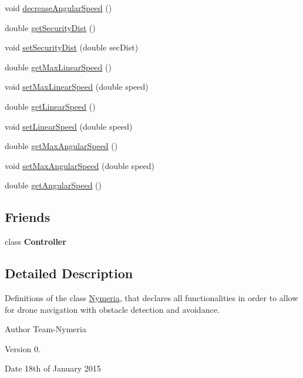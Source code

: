 \begin{DoxyCompactItemize}
void \hyperlink{classNymeria_a354a426d9626623eb60f59bea93cf888}{decrease\-Angular\-Speed} ()
\item 
double \hyperlink{classNymeria_a39846f73d57a98ab24a80a80be38ddef}{get\-Security\-Dist} ()
\item 
void \hyperlink{classNymeria_af145b44f01dc82ba70f3b09bc459364d}{set\-Security\-Dist} (double sec\-Dist)
\item 
double \hyperlink{classNymeria_adce898b1df4cdfe04a3dd6fca7745f36}{get\-Max\-Linear\-Speed} ()
\item 
void \hyperlink{classNymeria_a97fb26da752c0ac03b4f0874f9513e01}{set\-Max\-Linear\-Speed} (double speed)
\item 
double \hyperlink{classNymeria_a791c7e89a7044302557f7f1dbd6f6f84}{get\-Linear\-Speed} ()
\item 
void \hyperlink{classNymeria_a6217513fd20574947ec6ca0405668c1a}{set\-Linear\-Speed} (double speed)
\item 
double \hyperlink{classNymeria_abee78301bcaf62d61f2777aa2c5b9449}{get\-Max\-Angular\-Speed} ()
\item 
void \hyperlink{classNymeria_a8f4694ca2039c6893706566b8b368833}{set\-Max\-Angular\-Speed} (double speed)
\item 
double \hyperlink{classNymeria_a5020233162c927226ff48dc211dbb225}{get\-Angular\-Speed} ()
\end{DoxyCompactItemize}
\subsection*{\-Friends}
\begin{DoxyCompactItemize}
\item 
\hypertarget{classNymeria_ac3456fd331a58b288082abca310c7a99}{class {\bfseries \-Controller}}\label{classNymeria_ac3456fd331a58b288082abca310c7a99}

\end{DoxyCompactItemize}


\subsection{\-Detailed \-Description}
\-Definitions of the class \hyperlink{classNymeria}{\-Nymeria}, that declares all functionalities in order to allow for drone navigation with obstacle detection and avoidance.

\begin{DoxyAuthor}{\-Author}
\-Team-\/\-Nymeria 
\end{DoxyAuthor}
\begin{DoxyVersion}{\-Version}
0. 
\end{DoxyVersion}
\begin{DoxyDate}{\-Date}
18th of \-January 2015 
\end{DoxyDate}


